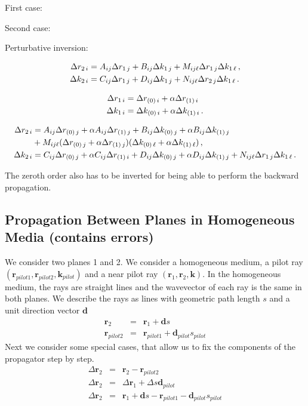 \documentclass[12pt,a4paper,twoside,openright,BCOR10mm,headsepline,titlepage,abstracton,chapterprefix,final]{scrreprt}
\newcommand\Vector[1]{{\mathbf{#1}}}
\newcommand\wavenumber{k}
\newcommand\Wavevector{\Vector{\wavenumber}}
\begin{document}
First case:

Second case:

Perturbative inversion:

\begin{eqnarray}
 \Delta {r}_{2\,i} & = A_{ij} \Delta {r}_{1\,j} + B_{ij} \Delta {k}_{1\,j} + M_{ij\ell} \Delta {r}_{1\,j} \Delta {k}_{1\,\ell}\,,\\
 \Delta {k}_{2\,i} & = C_{ij} \Delta {r}_{1\,j} + D_{ij} \Delta {k}_{1\,j} + N_{ij\ell} \Delta {r}_{2\,j} \Delta {k}_{1\,\ell}\,.
\end{eqnarray}

\begin{eqnarray}
 \Delta {r}_{1\,i} & = \Delta {r}_{(0)\,i} + \alpha \Delta {r}_{(1)\,i}\\
 \Delta {k}_{1\,i} & = \Delta {k}_{(0)\,i} + \alpha \Delta {k}_{(1)\,i}\,.
\end{eqnarray}

\begin{eqnarray}
 \Delta {r}_{2\,i} & = A_{ij} \Delta {r}_{(0)\,j} + \alpha A_{ij} \Delta {r}_{(1)\,j} + B_{ij} \Delta {k}_{(0)\,j} + \alpha B_{ij}\Delta {k}_{(1)\,j}\nonumber\\
  & + M_{ij\ell} (\Delta {r}_{(0)\,j} + \alpha \Delta {r}_{(1)\,j}) (\Delta {k}_{(0)\,\ell} + \alpha \Delta {k}_{(1)\,\ell})\,,\\
 \Delta {k}_{2\,i} & = C_{ij} \Delta {r}_{(0)\,j} + \alpha C_{ij} \Delta {r}_{(1)\,i} + D_{ij} \Delta {k}_{(0)\,j} + \alpha D_{ij}\Delta {k}_{(1)\,j} + N_{ij\ell} \Delta {r}_{1\,j} \Delta {k}_{1\,\ell}\,.
\end{eqnarray}

The zeroth order also has to be inverted for being able to perform the backward propagation.


\subsection{Propagation Between Planes in Homogeneous Media (contains errors)}
We consider two planes 1 and 2.
We consider a homogeneous medium, a pilot ray $( \Vector{r}_{pilot1}, \Vector{r}_{pilot2}, \Wavevector_{pilot} )$
and a near pilot ray $( \Vector{r}_{1}, \Vector{r}_{2}, \Wavevector )$. 
In the homogeneous medium, the rays are straight lines and the wavevector of each ray is the same in both planes.
We describe the rays as lines with geometric path length $s$ and a unit direction vector $\Vector{d}$
\begin{eqnarray}
 \Vector{r}_{2} &=& \Vector{r}_{1} + \Vector{d} s  \\
 \Vector{r}_{pilot2} &=& \Vector{r}_{pilot1} + \Vector{d}_{pilot} s_{pilot}
\end{eqnarray}
Next we consider some special cases, that allow us to fix the components of the propagator step by step.
\begin{eqnarray}
 \Delta \Vector{r}_2 &=& \Vector{r}_{2} - \Vector{r}_{pilot2} \\
 \Delta \Vector{r}_2 &=& \Delta \Vector{r}_1 + \Delta s \Vector{d}_{pilot} \\
 \Delta \Vector{r}_2 &=& \Vector{r}_{1} + \Vector{d} s  - \Vector{r}_{pilot1} - \Vector{d}_{pilot} s_{pilot}
\end{eqnarray}
\end{document}
